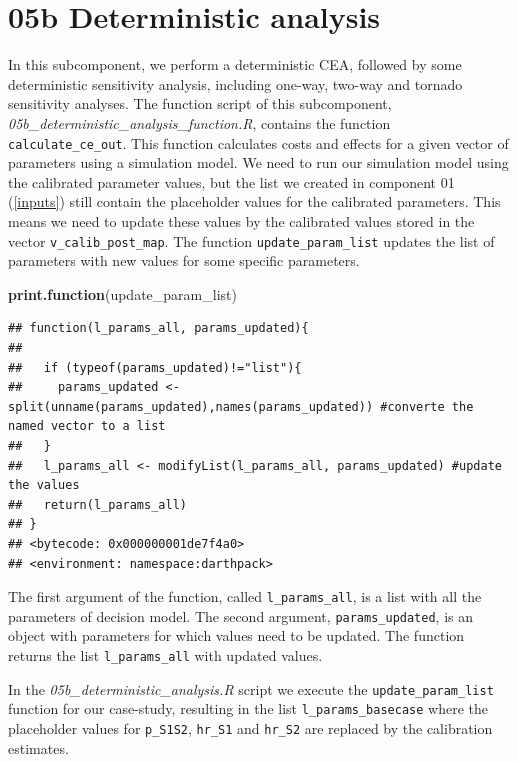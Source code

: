 \documentclass[]{book}
\newenvironment{Shaded}{\begin{snugshade}}{\end{snugshade}}
\newcommand{\KeywordTok}[1]{\textcolor[rgb]{0.13,0.29,0.53}{\textbf{#1}}}
\newcommand{\NormalTok}[1]{#1}
\begin{document}
\hypertarget{Deterministic-analysis}{%
\section{05b Deterministic analysis}\label{Deterministic-analysis}}

In this subcomponent, we perform a deterministic CEA, followed by some deterministic sensitivity analysis, including one-way, two-way and tornado sensitivity analyses. The function script of this subcomponent, \emph{05b\_deterministic\_analysis\_function.R}, contains the function \texttt{calculate\_ce\_out}. This function calculates costs and effects for a given vector of parameters using a simulation model. We need to run our simulation model using the calibrated parameter values, but the list we created in component 01 (\ref{inputs}) still contain the placeholder values for the calibrated parameters. This means we need to update these values by the calibrated values stored in the vector \texttt{v\_calib\_post\_map}. The function \texttt{update\_param\_list} updates the list of parameters with new values for some specific parameters.

\begin{Shaded}
\begin{Highlighting}[]
\KeywordTok{print.function}\NormalTok{(update_param_list)}
\end{Highlighting}
\end{Shaded}

\begin{verbatim}
## function(l_params_all, params_updated){
##   
##   if (typeof(params_updated)!="list"){
##     params_updated <- split(unname(params_updated),names(params_updated)) #converte the named vector to a list
##   }
##   l_params_all <- modifyList(l_params_all, params_updated) #update the values
##   return(l_params_all)
## }
## <bytecode: 0x000000001de7f4a0>
## <environment: namespace:darthpack>
\end{verbatim}

The first argument of the function, called \texttt{l\_params\_all}, is a list with all the parameters of decision model. The second argument, \texttt{params\_updated}, is an object with parameters for which values need to be updated. The function returns the list \texttt{l\_params\_all} with updated values.

In the \emph{05b\_deterministic\_analysis.R} script we execute the \texttt{update\_param\_list} function for our case-study, resulting in the list \texttt{l\_params\_basecase} where the placeholder values for \texttt{p\_S1S2}, \texttt{hr\_S1} and \texttt{hr\_S2} are replaced by the calibration estimates.
\end{document}

